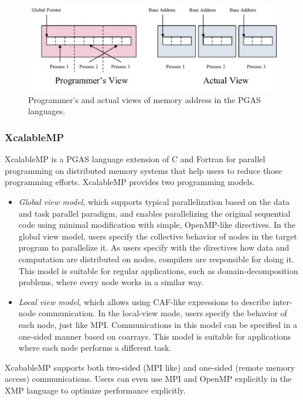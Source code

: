 \begin{figure}[htbp]
	\centering
	\includegraphics[width=6.3in]{fig/pgas.pdf}
	\caption{Programmer's and actual views of memory address in the PGAS languages.}
	\label{fig:pgas}
\end{figure}

\subsubsection{XcalableMP}

XcalableMP \cite{lee2010implementation} is a PGAS language extension of C and Fortran for parallel programming on distributed memory systems that help users to reduce those programming efforts. XcalableMP provides two programming models. 

\begin{itemize}
	\item \textit{Global view model}, which supports typical parallelization based on the data and task parallel paradigm, and enables parallelizing the original sequential code using minimal modification with simple, OpenMP-like directives. In the global view model, users specify the collective behavior of nodes in the target program to parallelize it. As users specify with the directives how data and computation are distributed on nodes, compilers are responsible for doing it. This model is suitable for regular applications, such as domain-decomposition problems, where every node works in a similar way.
	
	\item \textit{Local view model}, which allows using CAF-like expressions to describe inter-node communication. In the local-view mode, users specify the behavior of each node, just like MPI. Communications in this model can be specified in a one-sided manner based on coarrays. This model is suitable for applications where each node performs a different task.
\end{itemize}

XcabableMP supports both two-sided (MPI like) and one-sided (remote memory access) communications. Users can even use MPI and OpenMP explicitly in the XMP language to optimize performance explicitly.

